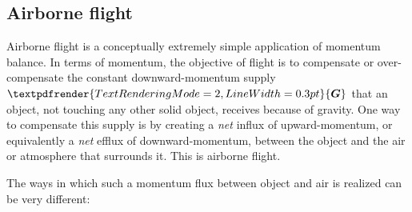 \documentclass[a4paper,12pt,%
onecolumn,oneside,titlepage,%
british%
]{memoir}
\renewcommand*{\bm}[1]{\textpdfrender{TextRenderingMode=2,LineWidth=0.3pt}{\boldsymbol{#1}}}
\renewcommand*{\|}[1][]{\nonscript\:#1\vert\nonscript\:\mathopen{}}
\newcommand*{\yG}{\bm{G}}
\begin{document}
\subsection{Airborne flight}
\label{sec:bal_momentum_flight}

Airborne flight is a conceptually extremely simple application of momentum balance.
In terms of momentum, the objective of flight is to compensate or over-compensate the constant downward-momentum supply $\yG$ that an object, not touching any other solid object, receives because of gravity. One way to compensate this supply is by creating a \emph{net} influx of upward-momentum, or equivalently a \emph{net} efflux of downward-momentum, between the object and the air or atmosphere that surrounds it. This is airborne flight.

The ways in which such a momentum flux between object and air is realized can be very different:
\end{document}
